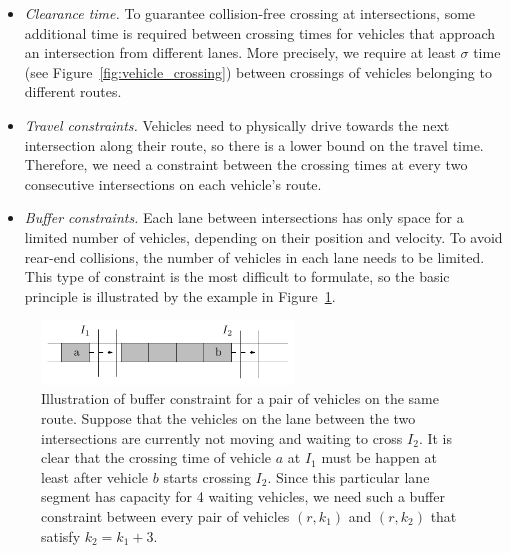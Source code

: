 \documentclass[notitlepage]{report}
\begin{document}
\begin{itemize}
  \item \textit{Clearance time.} To guarantee collision-free crossing at
        intersections, some additional time is required between crossing times
        for vehicles that approach an intersection from different lanes. More
        precisely, we require at least $\sigma$ time (see
        Figure~\ref{fig:vehicle_crossing}) between crossings of vehicles
        belonging to different routes.

  \item \textit{Travel constraints.} Vehicles need to physically drive towards
        the next intersection along their route, so there is a lower bound on
        the travel time. Therefore, we need a constraint between the crossing
        times at every two consecutive intersections on each vehicle's route.

  \item \textit{Buffer constraints.} Each lane between intersections has only
        space for a limited number of vehicles, depending on their position and
        velocity. To avoid rear-end collisions, the number of vehicles in each
        lane needs to be limited.
        This type of constraint is the most difficult to formulate, so the basic
        principle is illustrated by the example in
        Figure~\ref{fig:buffer_constraints}.
\end{itemize}

\begin{figure}[h]
  \centering
  \includegraphics[width=0.6\textwidth]{figures/buffer_constraints.pdf}
  \caption{Illustration of buffer constraint for a pair of vehicles on the same
    route. Suppose that the vehicles on the lane between the two intersections
    are currently not moving and waiting to cross $I_{2}$. It is clear that the
    crossing time of vehicle $a$ at $I_{1}$ must be happen at least after
    vehicle $b$ starts crossing $I_{2}$. Since this particular lane segment has
    capacity for 4 waiting vehicles, we need such a buffer constraint between
    every pair of vehicles $(r,k_{1})$ and $(r,k_{2})$ that satisfy
    $k_{2} = k_{1} + 3$.}
  \label{fig:buffer_constraints}
  \end{figure}
\end{document}
